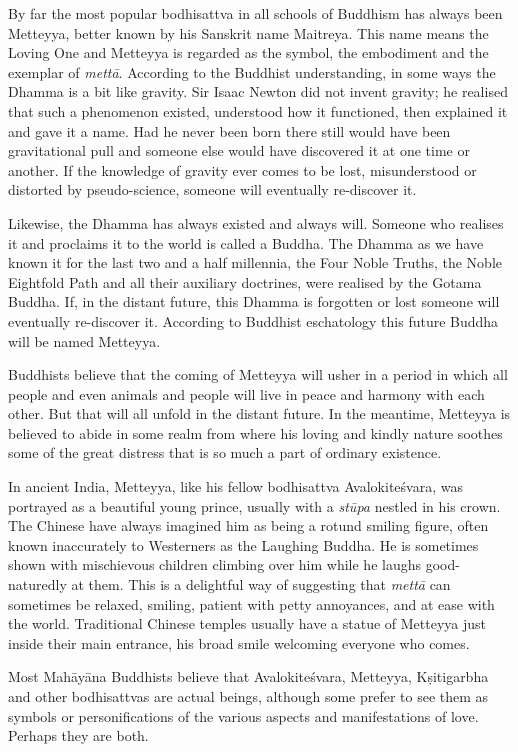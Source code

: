 \documentclass[10pt, openright]{book}
\begin{document}
By far the most popular bodhisattva in all schools of Buddhism has always been Metteyya, better known by his Sanskrit name Maitreya. This name means the Loving One and Metteyya is regarded as the symbol, the embodiment and the exemplar of \textit{mettā}. According to the Buddhist understanding, in some ways the Dhamma is a bit like gravity. Sir Isaac Newton did not invent gravity; he realised that such a phenomenon existed, understood how it functioned, then explained it and gave it a name. Had he never been born there still would have been gravitational pull and someone else would have discovered it at one time or another. If the knowledge of gravity ever comes to be lost, misunderstood or distorted by pseudo-science, someone will eventually re-discover it.


Likewise, the Dhamma has always existed and always will. Someone who realises it and proclaims it to the world is called a Buddha. The Dhamma as we have known it for the last two and a half millennia, the Four Noble Truths, the Noble Eightfold Path and all their auxiliary doctrines, were realised by the Gotama Buddha. If, in the distant future, this Dhamma is forgotten or lost someone will eventually re-discover it. According to Buddhist eschatology this future Buddha will be named Metteyya.


Buddhists believe that the coming of Metteyya will usher in a period in which all people and even animals and people will live in peace and harmony with each other. But that will all unfold in the distant future. In the meantime, Metteyya is believed to abide in some realm from where his loving and kindly nature soothes some of the great distress that is so much a part of ordinary existence.


In ancient India, Metteyya, like his fellow bodhisattva Avalokiteśvara, was portrayed as a beautiful young prince, usually with a \textit{stūpa} nestled in his crown. The Chinese have always imagined him as being a rotund smiling figure, often known inaccurately to Westerners as the Laughing Buddha. He is sometimes shown with mischievous children climbing over him while he laughs good-naturedly at them. This is a delightful way of suggesting that \textit{mettā} can sometimes be relaxed, smiling, patient with petty annoyances, and at ease with the world. Traditional Chinese temples usually have a statue of Metteyya just inside their main entrance, his broad smile welcoming everyone who comes.


Most Mahāyāna Buddhists believe that Avalokiteśvara, Metteyya, Kṣitigarbha and other bodhisattvas are actual beings, although some prefer to see them as symbols or personifications of the various aspects and manifestations of love. Perhaps they are both.
\end{document}

